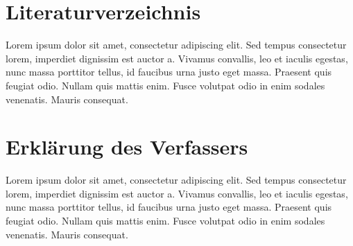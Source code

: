 \documentclass[a4paper,12pt]{article}			%
\begin{document}
\newpage
\section{Literaturverzeichnis}



Lorem ipsum dolor sit amet, consectetur adipiscing elit. Sed tempus consectetur lorem, imperdiet dignissim est auctor a. Vivamus convallis, leo et iaculis egestas, nunc massa porttitor tellus, id faucibus urna justo eget massa. Praesent quis feugiat odio. Nullam quis mattis enim. Fusce volutpat odio in enim sodales venenatis. Mauris consequat.


\newpage
\section{Erklärung des Verfassers}



Lorem ipsum dolor sit amet, consectetur adipiscing elit. Sed tempus consectetur lorem, imperdiet dignissim est auctor a. Vivamus convallis, leo et iaculis egestas, nunc massa porttitor tellus, id faucibus urna justo eget massa. Praesent quis feugiat odio. Nullam quis mattis enim. Fusce volutpat odio in enim sodales venenatis. Mauris consequat.
\end{document}
